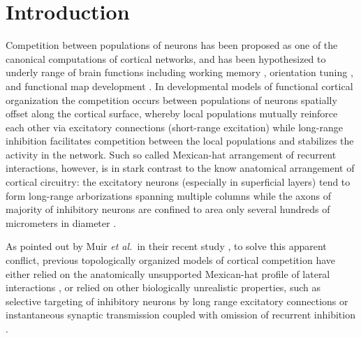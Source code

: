 \documentclass[utf8]{frontiersSCNS}
\newcommand{\etal}{\textit{et al.}}
\begin{document}


\section{Introduction}

Competition between populations of neurons has been proposed as one of the canonical computations of cortical 
networks, and has been hypothesized to underly range of brain functions including working memory \citep{Amit1995,Durstewitz2000},
orientation tuning \citep{Somers1995,Ben-Yishai1995}, and functional map development \citep{VonderMalsburg1973,CMVC,Antolik2011}.
In developmental models of functional cortical organization the competition occurs between populations of neurons spatially offset 
along the cortical surface, whereby local populations mutually reinforce each other via excitatory connections (short-range 
excitation) while long-range inhibition facilitates competition between the local populations and stabilizes the activity in the 
network. Such so called Mexican-hat arrangement of recurrent interactions, however, is in stark contrast to the know anatomical arrangement
of cortical circuitry: the excitatory neurons (especially in superficial layers) tend to form long-range arborizations spanning 
multiple columns while the axons of majority of inhibitory neurons are confined to area only several hundreds of micrometers 
in diameter \citep{Buzas2006,Budd2001}. 


As pointed out by Muir \etal\, in their recent study \citep{Muir2014}, to solve this apparent conflict, previous topologically organized models of cortical competition have either relied on the anatomically unsupported Mexican-hat profile of lateral interactions \citep{VonderMalsburg1973,CMVC}, or relied on other biologically unrealistic properties, such as selective targeting of inhibitory neurons by long range excitatory connections \citep{law:phd09,Rutishauser2012} or instantaneous synaptic transmission coupled with omission of recurrent inhibition \citep{Kang2003,Levy2011,Grabska-Barwinska2008}. 
\end{document}
